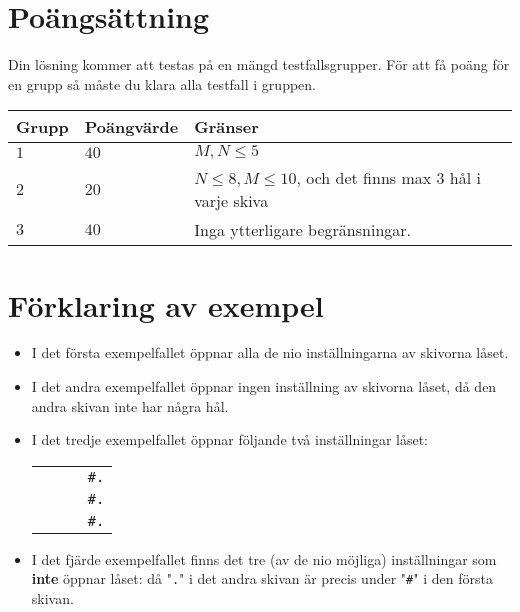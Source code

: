 \section*{Poängsättning}
Din lösning kommer att testas på en mängd testfallsgrupper.
För att få poäng för en grupp så måste du klara alla testfall i gruppen.

\noindent
\begin{tabular}{| l | l | l |}
  \hline
  Grupp & Poängvärde & Gränser \\ \hline
  $1$    & $40$        &  $M, N \le 5$ \\ \hline 
  $2$    & $20$        &  $N \le 8, M \le 10$, och det finns max 3 hål i varje skiva \\ \hline 
  $3$    & $40$        &  Inga ytterligare begränsningar. \\ \hline
\end{tabular}

\section*{Förklaring av exempel}

\begin{itemize}
  \item
I det första exempelfallet öppnar alla de nio inställningarna av skivorna låset.

  \item
I det andra exempelfallet öppnar ingen inställning av skivorna låset, då den andra skivan inte har några hål.

  \item
I det tredje exempelfallet öppnar följande två inställningar låset:
\begin{center}
  \begin{tabular}{ll|ll}
    \rightline{\texttt{.\#}}&&& \texttt{\#.}\\
    \rightline{\texttt{.\#}}&&& \texttt{\#.}\\
    \rightline{\texttt{.\#}}&&& \texttt{\#.}
  \end{tabular}
\end{center}

  \item
    I det fjärde exempelfallet finns det tre (av de nio möjliga) inställningar som \textbf{inte} öppnar låset: då "\texttt{.}" i det andra skivan är precis under
    "\texttt{\#}" i den första skivan.

\end{itemize}
